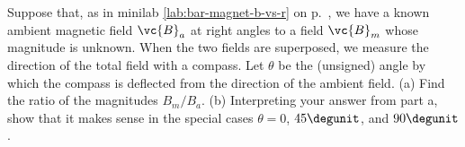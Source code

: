 Suppose that, as in minilab \ref{lab:bar-magnet-b-vs-r} on p.~\pageref{lab:bar-magnet-b-vs-r}, we have a
known ambient magnetic field $\vc{B}_a$ at right angles to a field $\vc{B}_m$ whose magnitude is unknown.
When the two fields are superposed, we measure the direction of the total
field with a compass. Let $\theta$ be the (unsigned) angle by which the compass is deflected from
the direction of the ambient field. (a) Find the ratio of the magnitudes
$B_m/B_a$.
\answercheck\hwendpart
(b) Interpreting your answer from part a, show that it makes sense in the special cases
$\theta=0$, $45\degunit$, and $90\degunit$.
